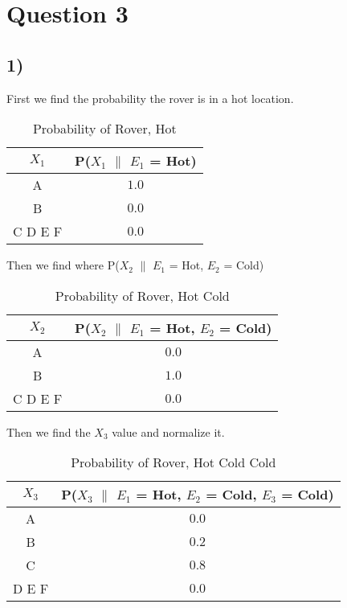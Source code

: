 \documentclass{article}
\begin{document}
	\section*{Question 3}
	\subsection*{1)}
	
		First we find the probability the rover is in a hot location.
		\begin{table}[h!]
			\begin{center}
				\caption{Probability of Rover, Hot}
				\begin{tabular}{c|c}
				\textbf{$X_1$} & \textbf{P($X_1$ $\|$ $E_1$ = Hot)}\\
				\hline
				A & $1.0$\\
				B & $0.0$\\
				C D E F & $0.0$\\
				\end{tabular}
			\end{center}
		\end{table}
		
		Then we find where P($X_2$ $\|$ $E_1$ = Hot, $E_2$ = Cold)
		
		\begin{table}[h!]
			\begin{center}
				\caption{Probability of Rover, Hot Cold}
				\begin{tabular}{c|c}
				\textbf{$X_2$} & \textbf{P($X_2$ $\|$ $E_1$ = Hot, $E_2$ = Cold)}\\
				\hline
				A & $0.0$\\
				B & $1.0$\\
				C D E F & $0.0$\\
				\end{tabular}
			\end{center}
		\end{table}
		
		Then we find the $X_3$ value and normalize it.
		
		\begin{table}[h!]
			\begin{center}
				\caption{Probability of Rover, Hot Cold Cold}
				\begin{tabular}{c|c}
				\textbf{$X_3$} & \textbf{P($X_3$ $\|$ $E_1$ = Hot, $E_2$ = Cold, $E_3$ = Cold)}\\
				\hline
				A & $0.0$\\
				B & $0.2$\\
				C & $0.8$\\
				D E F & $0.0$\\
				\end{tabular}
			\end{center}
		\end{table}
\end{document}
